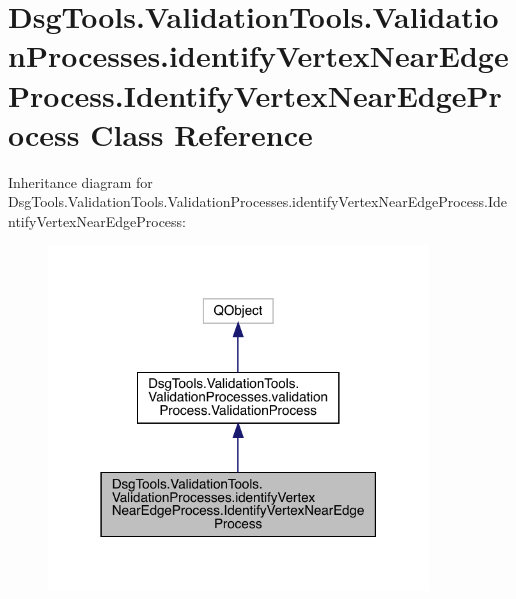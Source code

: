 \hypertarget{class_dsg_tools_1_1_validation_tools_1_1_validation_processes_1_1identify_vertex_near_edge_proce6037dafbf6b8f68cfd2bcf606f8923c2}{}\section{Dsg\+Tools.\+Validation\+Tools.\+Validation\+Processes.\+identify\+Vertex\+Near\+Edge\+Process.\+Identify\+Vertex\+Near\+Edge\+Process Class Reference}
\label{class_dsg_tools_1_1_validation_tools_1_1_validation_processes_1_1identify_vertex_near_edge_proce6037dafbf6b8f68cfd2bcf606f8923c2}


Inheritance diagram for Dsg\+Tools.\+Validation\+Tools.\+Validation\+Processes.\+identify\+Vertex\+Near\+Edge\+Process.\+Identify\+Vertex\+Near\+Edge\+Process\+:
\nopagebreak
\begin{figure}[H]
\begin{center}
\leavevmode
\includegraphics[width=286pt]{class_dsg_tools_1_1_validation_tools_1_1_validation_processes_1_1identify_vertex_near_edge_proce7c8d9a8932392ed78cb89748de71b303}
\end{center}
\end{figure}


